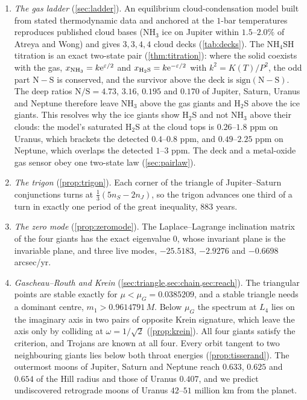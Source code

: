 \documentclass[11pt]{article}
\theoremstyle{definition}\newtheorem{definition}[theorem]{Definition}
\theoremstyle{remark}\newtheorem{remark}[theorem]{Remark}
\newcommand{\NH}{\mathrm{NH_3}}\newcommand{\HS}{\mathrm{H_2S}}\newcommand{\NHSH}{\mathrm{NH_4SH}}
\begin{document}
\begin{enumerate}[label=\textbf{\arabic*.},leftmargin=1.8em]
\item \emph{The gas ladder} (\cref{sec:ladder}). An equilibrium cloud-condensation model built from stated thermodynamic data and anchored at the $1$-bar temperatures reproduces published cloud bases (NH$_3$ ice on Jupiter within $1.5$--$2.0\%$ of Atreya and Wong) and gives $3,3,4,4$ cloud decks (\cref{tab:decks}). The $\NHSH$ titration is an exact two-state pair (\cref{thm:titration}): where the solid coexists with the gas, $x_{\NH}=k\e^{\varepsilon/2}$ and $x_{\HS}=k\e^{-\varepsilon/2}$ with $k^2=K(T)/P^2$, the odd part $\mathrm N-\mathrm S$ is conserved, and the survivor above the deck is $\mathrm{sign}(\mathrm N-\mathrm S)$. The deep ratios $\mathrm{N/S}=4.73$, $3.16$, $0.195$ and $0.170$ of Jupiter, Saturn, Uranus and Neptune therefore leave NH$_3$ above the gas giants and H$_2$S above the ice giants. This resolves why the ice giants show H$_2$S and not NH$_3$ above their clouds: the model's saturated H$_2$S at the cloud tops is $0.26$--$1.8$ ppm on Uranus, which brackets the detected $0.4$--$0.8$ ppm, and $0.49$--$2.25$ ppm on Neptune, which overlaps the detected $1$--$3$ ppm. The deck and a metal-oxide gas sensor obey one two-state law (\cref{sec:pairlaw}).
\item \emph{The trigon} (\cref{prop:trigon}). Each corner of the triangle of Jupiter--Saturn conjunctions turns at $\frac13(5n_S-2n_J)$, so the trigon advances one third of a turn in exactly one period of the great inequality, $883$ years.
\item \emph{The zero mode} (\cref{prop:zeromode}). The Laplace--Lagrange inclination matrix of the four giants has the exact eigenvalue $0$, whose invariant plane is the invariable plane, and three live modes, $-25.5183$, $-2.9276$ and $-0.6698$ arcsec/yr.
\item \emph{Gascheau--Routh and Krein} (\cref{sec:triangle,sec:chain,sec:reach}). The triangular points are stable exactly for $\mu<\mu_G=0.0385209$, and a stable triangle needs a dominant centre, $m_1>0.9614791\,M$. Below $\mu_G$ the spectrum at $L_4$ lies on the imaginary axis in two pairs of opposite Krein signature, which leave the axis only by colliding at $\omega=1/\sqrt2$ (\cref{prop:krein}). All four giants satisfy the criterion, and Trojans are known at all four. Every orbit tangent to two neighbouring giants lies below both throat energies (\cref{prop:tisserand}). The outermost moons of Jupiter, Saturn and Neptune reach $0.633$, $0.625$ and $0.654$ of the Hill radius and those of Uranus $0.407$, and we predict undiscovered retrograde moons of Uranus $42$--$51$ million km from the planet.

\end{enumerate}
\end{document}
